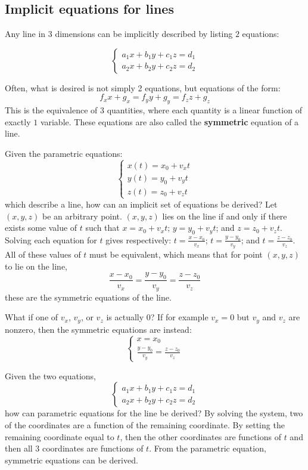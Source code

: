 \documentclass{article}
\begin{document}
\vspace{5mm}

\subsection*{Implicit equations for lines}

Any line in 3 dimensions can be implicitly described by listing \(2\) equations:

\[\left\{\begin{array}{c}
a_1 x + b_1 y + c_1 z = d_1 \\ 
a_2 x + b_2 y + c_2 z = d_2 
\end{array}\right.\]

Often, what is desired is not simply 2 equations, but equations of the form:
\[f_x x + g_x = f_y y + g_y = f_z z + g_z\]
This is the equivalence of \(3\) quantities, where each quantity is a linear function of exactly \(1\) variable. These equations are also called the {\bf symmetric} equation of a line. 

Given the parametric equations:
\[\left\{\begin{array}{c} x(t) = x_0 + v_x t \\ y(t) = y_0 + v_y t \\ z(t) = z_0 + v_z t \end{array}\right.\]
which describe a line, how can an implicit set of equations be derived? Let \((x, y, z)\) be an arbitrary point. \((x, y, z)\) lies on the line if and only if there exists some value of \(t\) such that \(x = x_0 + v_x t\); \(y = y_0 + v_y t\); and \(z = z_0 + v_z t\). Solving each equation for \(t\) gives respectively: \(t = \frac{x - x_0}{v_x}\); \(t = \frac{y - y_0}{v_y}\); and \(t = \frac{z - z_0}{v_z}\). All of these values of \(t\) must be equivalent, which means that for point \((x, y, z)\) to lie on the line,
\[\frac{x - x_0}{v_x} = \frac{y - y_0}{v_y} = \frac{z - z_0}{v_z}\]    
these are the symmetric equations of the line.  

What if one of \(v_x\), \(v_y\), or \(v_z\) is actually \(0\)? If for example \(v_x = 0\) but \(v_y\) and \(v_z\) are nonzero, then the symmetric equations are instead:
\[\left\{\begin{array}{c}
x = x_0 \\ 
\frac{y - y_0}{v_y} = \frac{z - z_0}{v_z}
\end{array}\right.\]

Given the two equations,
\[\left\{\begin{array}{c}
a_1 x + b_1 y + c_1 z = d_1 \\ 
a_2 x + b_2 y + c_2 z = d_2 
\end{array}\right.\]
how can parametric equations for the line be derived? By solving the system, two of the coordinates are a function of the remaining coordinate. By setting the remaining coordinate equal to \(t\), then the other coordinates are functions of \(t\) and then all \(3\) coordinates are functions of \(t\). From the parametric equation, symmetric equations can be derived. 
\end{document}
